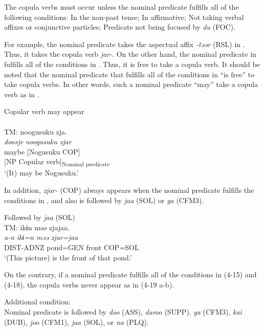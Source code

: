 \ea\label{ex:4.15} The copula verbs must occur unless the nominal predicate fulfills all of the following conditions:
\ea In the non-past tense;
\ex In affirmative;
\ex Not taking verbal affixes or conjunctive particles;
\ex Predicate not being focused by \textit{du} (FOC).
\z
\z

\noindent For example, the nominal predicate takes the aspectual affix \textit{{}-təər} (RSL) in . Thus, it takes the copula verb \textit{jar-}. On the other hand, the nominal predicate in  fulfills all of the conditions in . Thus, it is free to take a copula verb. It should be noted that the nominal predicate that fulfills all of the conditions in  “is free” to take copula verbs. In other words, such a nominal predicate “may” take a copula verb as in .

\ea\label{ex:4.16} Copular verb may appear \hfill\relax[Co: 120415\_00.txt]\\
\\
 {TM:}   {noogusuku}  {zja.}\\
   {\itshape doosje}  {\itshape noogusuku}  {\itshape zjar}\\
   {maybe}  {[Nogusuku}  {COP]}\\
     {[NP}  {Copular verb]\textsubscript{Nominal predicate}}\\
 \glt{} ‘(It) may be Nogusuku.’
\z

In addition, \textit{zjar-} (COP) always appears when the nominal predicate fulfills the conditions in , and also is followed by \textit{jaa} (SOL) or \textit{ga} (CFM3).
 

\ea\label{ex:4.17} Followed by \textit{jaa} (SOL)\hfill\relax[Co: 111113\_02.txt]\\
 {TM:}   {ikɨn}  {məə}  {zjajaa.}\\
   {\itshape a-n}  {\itshape ikɨ=n}  {\itshape məə}  {\textit{zjar=jaa}}\\
   {DIST-ADNZ}  {pond=GEN}  {front}  {COP=SOL}\\
\glt{} ‘(This picture) is the front of that pond.’
\z

On the contrary, if a nominal predicate fulfills all of the conditions in (4-15) and (4-18), the copula verbs never appear as in (4-19 a-b).

\ea\label{ex:4.18}Additional condition:\\
Nominal predicate is followed by \textit{doo} (ASS), \textit{daroo} (SUPP), \textit{ga} (CFM3), \textit{kai} (DUB), \textit{joo} (CFM1), \textit{jaa} (SOL), or \textit{na} (PLQ).
\z

